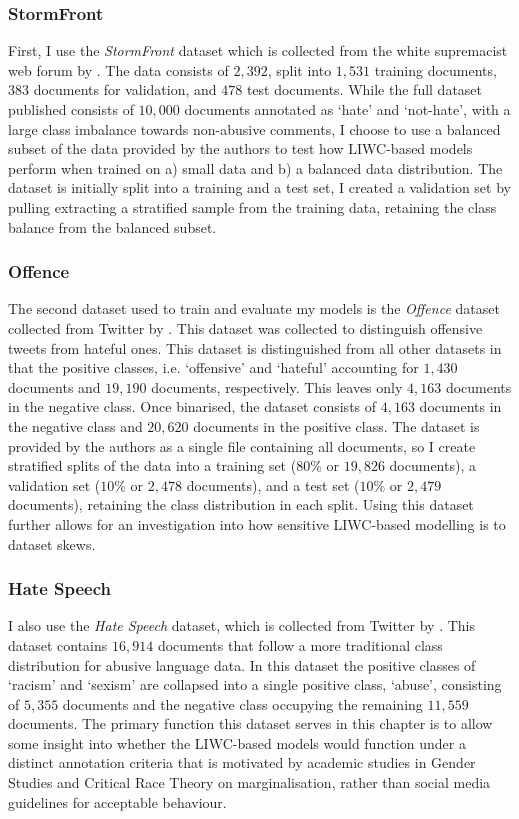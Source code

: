 \subsubsection{StormFront}
First, I use the \textit{StormFront} dataset which is collected from the white supremacist web forum by \citet{Garcia:2019}. The data consists of $2,392$, split into $1,531$ training documents, $383$ documents for validation, and $478$ test documents. While the full dataset published consists of $10,000$ documents annotated as `hate' and `not-hate', with a large class imbalance towards non-abusive comments, I choose to use a balanced subset of the data provided by the authors to test how LIWC-based models perform when trained on a) small data and b) a balanced data distribution.
The dataset is initially split into a training and a test set, I created a validation set by pulling extracting a stratified sample from the training data, retaining the class balance from the balanced subset.

\subsubsection{Offence}
The second dataset used to train and evaluate my models is the \textit{Offence} dataset collected from Twitter by \citet{Davidson:2017}. This dataset was collected to distinguish offensive tweets from hateful ones. This dataset is distinguished from all other datasets in that the positive classes, i.e. `offensive' and `hateful' accounting for $1,430$ documents and $19,190$ documents, respectively. This leaves only $4,163$ documents in the negative class. Once binarised, the dataset consists of $4,163$ documents in the negative class and $20,620$ documents in the positive class. The dataset is provided by the authors as a single file containing all documents, so I create stratified splits of the data into a training set ($80\%$ or $19,826$ documents), a validation set ($10\%$ or $2,478$ documents), and a test set ($10\%$ or $2,479$ documents), retaining the class distribution in each split. Using this dataset further allows for an investigation into how sensitive LIWC-based modelling is to dataset skews.

\subsubsection{Hate Speech}
I also use the \textit{Hate Speech} dataset, which is collected from Twitter by \citet{Waseem-Hovy:2016}. This dataset contains $16,914$ documents that follow a more traditional class distribution for abusive language data. In this dataset the positive classes of `racism' and `sexism' are collapsed into a single positive class, `abuse', consisting of $5,355$ documents and the negative class occupying the remaining $11,559$ documents. The primary function this dataset serves in this chapter is to allow some insight into whether the LIWC-based models would function under a distinct annotation criteria that is motivated by academic studies in Gender Studies and Critical Race Theory on marginalisation, rather than social media guidelines for acceptable behaviour.

